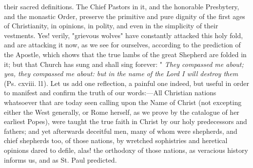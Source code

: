 their sacred definitions. The Chief Pastors in it, and the honorable
Presbytery, and the monastic Order, preserve the primitive and pure
dignity of the first ages of Christianity, in opinions, in polity, and
even in the simplicity of their vestments. Yes! verily, "grievous
wolves" have constantly attacked this holy fold, and are attacking it
now, as we see for ourselves, according to the prediction of the
Apostle, which shows that the true lambs of the great Shepherd are
folded in it; but that Church has sung and shall sing forever: "
\emph{They compassed me about; yea, they compassed me about: but in the
name of the Lord I will destroy them} (Ps\emph{.} cxviii. l1). Let us
add one reflection, a painful one indeed, but useful in order to
manifest and confirm the truth of our words:---All Christian nations
whatsoever that are today seen calling upon the Name of Christ (not
excepting either the West generally, or Rome herself, as we prove by the
catalogue of her earliest Popes), were taught the true faith in Christ
by our holy predecessors and fathers; and yet afterwards deceitful men,
many of whom were shepherds, and chief shepherds too, of those nations,
by wretched sophistries and heretical opinions dared to defile, alas!
the orthodoxy of those nations, as veracious history informs us, and as
St. Paul predicted.

